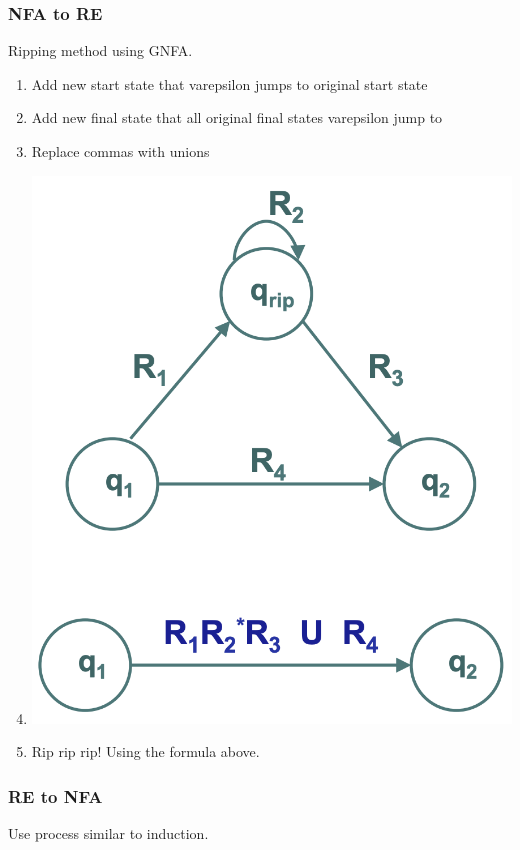 \documentclass{article}
\begin{document}
\subsubsection{NFA to RE}
Ripping method using GNFA.

\begin{enumerate}
    \item Add new start state that varepsilon jumps to original start state
    \item Add new final state that all original final states varepsilon jump to 
    \item Replace commas with unions
    \item \begin{minipage}[t]{\linewidth}
    \includegraphics[scale=0.25]{rip.png}
    \end{minipage}
    \item Rip rip rip! Using the formula above.
\end{enumerate}

\subsubsection{RE to NFA}
Use process similar to induction.
\end{document}
